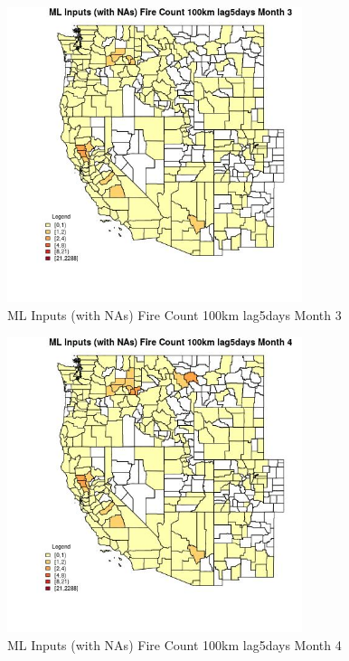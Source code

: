 \begin{figure} 
\centering  
\includegraphics[width=0.77\textwidth]{Code_Outputs/Report_ML_input_PM25_Step4_part_e_de_duplicated_aves_compiled_2019-05-21wNAs_CountyFire_Count_100km_lag5daysmedianMonth3.jpg} 
\caption{\label{fig:Report_ML_input_PM25_Step4_part_e_de_duplicated_aves_compiled_2019-05-21wNAsCountyFire_Count_100km_lag5daysmedianMonth3}ML Inputs (with NAs) Fire Count 100km lag5days Month 3} 
\end{figure} 
 

\begin{figure} 
\centering  
\includegraphics[width=0.77\textwidth]{Code_Outputs/Report_ML_input_PM25_Step4_part_e_de_duplicated_aves_compiled_2019-05-21wNAs_CountyFire_Count_100km_lag5daysmedianMonth4.jpg} 
\caption{\label{fig:Report_ML_input_PM25_Step4_part_e_de_duplicated_aves_compiled_2019-05-21wNAsCountyFire_Count_100km_lag5daysmedianMonth4}ML Inputs (with NAs) Fire Count 100km lag5days Month 4} 
\end{figure} 
 

